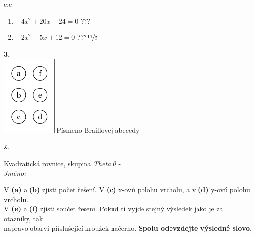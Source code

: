 \documentclass[10pt]{report}
\begin{document}
\begin{tabular}{c:c}
\begin{minipage}[c][104.5mm][t]{0.5\linewidth}
\begin{center}
\begin{minipage}{0.79\linewidth}
\begin{center}
\begin{varwidth}{\linewidth}
\begin{enumerate}
\item $-4x^2+20x-24=0$\quad \dotfill\; ???\;\dotfill {}
\item $-2x^2-5x+12=0$\quad \dotfill\; ???\;\dotfill \quad $\nicefrac{11}{2}$
\end{enumerate}
\end{varwidth}
\end{center}
\end{minipage}
\begin{minipage}{0.20\linewidth}
\begin{center}
{\Huge\bfseries 3.} \\[2mm]
\includegraphics[height=40mm]{../images/braille.png}
{\small Písmeno Braillovej abecedy}
\end{center}
\end{minipage}
\end{center}
\end{minipage}
&
\begin{minipage}[c][104.5mm][t]{0.5\linewidth}
\begin{center}
\vspace{7mm}
{\huge Kvadratická rovnice, skupina \textit{Theta $\theta$} -}\\[5mm]
\textit{Jméno:}\phantom{xxxxxxxxxxxxxxxxxxxxxxxxxxxxxxxxxxxxxxxxxxxxxxxxxxxxxxxxxxxxxxxxx}\\[5mm]
\begin{minipage}{0.95\linewidth}
\begin{center}
V \textbf{(a)} a \textbf{(b)} zjisti počet řešení. V \textbf{(c)} x-ovú polohu vrcholu, a v \textbf{(d)} y-ovú polohu vrcholu.\\V \textbf{(e)} a \textbf{(f)} zjisti součet řešení. Pokud ti vyjde stejný výsledek jako je za otazníky, tak\\napravo obarvi příslušející kroužek načerno. \textbf{Spolu odevzdejte výsledné slovo}.
\end{center}
\end{minipage}
\\[1mm]
\begin{minipage}{0.79\linewidth}
\begin{center}

\end{center}
\end{minipage}
\end{center}
\end{minipage}
\end{tabular}
\end{document}
